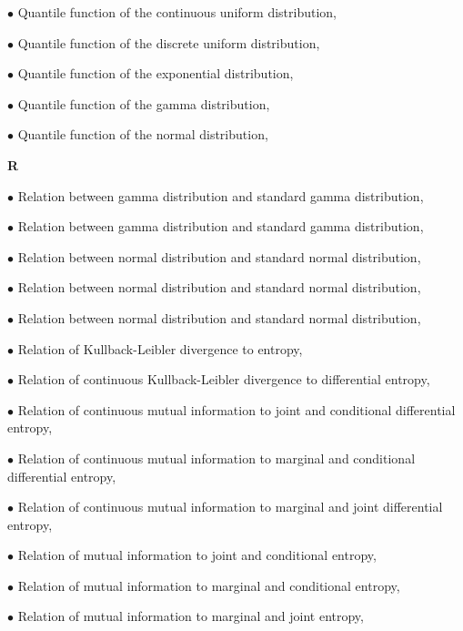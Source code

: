 \documentclass[a4paper,12pt,twoside]{book}
\begin{document}
$\bullet$ Quantile function of the continuous uniform distribution, \pageref{sec:cuni-qf}

$\bullet$ Quantile function of the discrete uniform distribution, \pageref{sec:duni-qf}

$\bullet$ Quantile function of the exponential distribution, \pageref{sec:exp-qf}

$\bullet$ Quantile function of the gamma distribution, \pageref{sec:gam-qf}

$\bullet$ Quantile function of the normal distribution, \pageref{sec:norm-qf}


\vspace{1em}
\textbf{R}

$\bullet$ Relation between gamma distribution and standard gamma distribution, \pageref{sec:gam-sgam}

$\bullet$ Relation between gamma distribution and standard gamma distribution, \pageref{sec:gam-sgam2}

$\bullet$ Relation between normal distribution and standard normal distribution, \pageref{sec:norm-snorm}

$\bullet$ Relation between normal distribution and standard normal distribution, \pageref{sec:norm-snorm2}

$\bullet$ Relation between normal distribution and standard normal distribution, \pageref{sec:norm-snorm3}

$\bullet$ Relation of Kullback-Leibler divergence to entropy, \pageref{sec:kl-ent}

$\bullet$ Relation of continuous Kullback-Leibler divergence to differential entropy, \pageref{sec:kl-dent}

$\bullet$ Relation of continuous mutual information to joint and conditional differential entropy, \pageref{sec:cmi-jcde}

$\bullet$ Relation of continuous mutual information to marginal and conditional differential entropy, \pageref{sec:cmi-mcde}

$\bullet$ Relation of continuous mutual information to marginal and joint differential entropy, \pageref{sec:cmi-mjde}

$\bullet$ Relation of mutual information to joint and conditional entropy, \pageref{sec:dmi-jce}

$\bullet$ Relation of mutual information to marginal and conditional entropy, \pageref{sec:dmi-mce}

$\bullet$ Relation of mutual information to marginal and joint entropy, \pageref{sec:dmi-mje}
\end{document}
